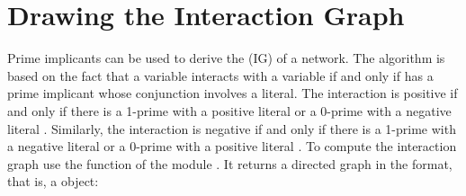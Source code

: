 \documentclass[letterpaper,10pt,english]{sphinxmanual}
\begin{document}
\begin{sphinxVerbatim}[commandchars=\\\{\}]
  
\PYG{p}{[}\PYG{p}{]}
\end{sphinxVerbatim}


\section{Drawing the Interaction Graph}
\label{\detokenize{Manual:drawing-the-interaction-graph}}\label{\detokenize{Manual:drawing-interaction-graphs}}
Prime implicants can be used to derive the  (IG) of a network.
The algorithm is based on the fact that a variable  interacts with a variable  if and only if 
has a prime implicant whose conjunction involves a  literal.
The interaction is positive if and only if there is a 1-prime with a positive literal  or a 0-prime with a negative literal .
Similarly, the interaction is negative if and only if there is a 1-prime with a negative literal  or a 0-prime with a positive literal .
To compute the interaction graph use the function {\hyperref[\detokenize{InteractionGraphs:primes2igraph}]{}} of the module {\hyperref[\detokenize{InteractionGraphs:interactiongraphs}]{}}.
It returns a directed graph in the {\hyperref[\detokenize{Installation:installation-networkx}]{}} format, that is, a  object:
\end{document}
